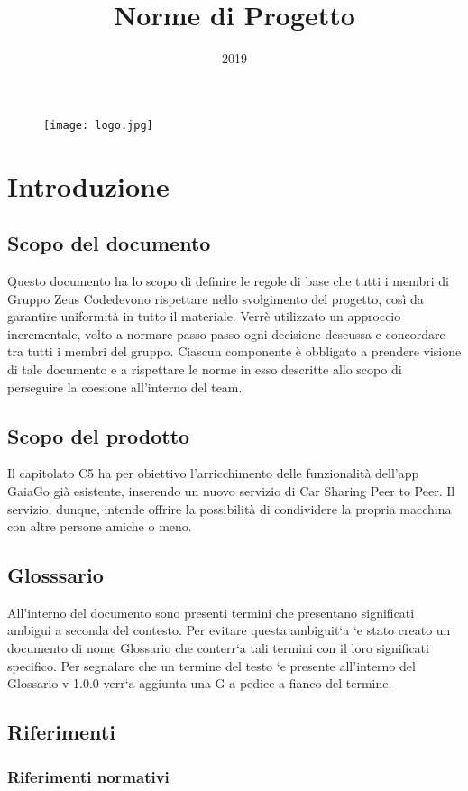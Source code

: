 \documentclass[a4paper]{article}
\title{Norme di Progetto}
\author{\GroupName}
\date{2019}
\newcommand{\GroupName} {Gruppo Zeus Code}
\begin{document}
\begin{figure}
	\centering
	\texttt{[image: logo.jpg]}
\end{figure}

\maketitle
\newpage
\tableofcontents
\newpage
\section{Introduzione}
\subsection{Scopo del documento}
Questo documento  ha lo scopo di definire le regole di base che tutti i membri di \GroupName devono rispettare nello svolgimento del progetto, così da garantire uniformità in tutto il materiale. Verrè utilizzato un approccio incrementale, volto a normare passo passo ogni decisione descussa e concordare tra tutti i membri del gruppo. Ciascun componente è obbligato a prendere visione di tale documento e a rispettare le norme in esso descritte allo scopo di perseguire la coesione all'interno del team.
\subsection{Scopo del prodotto}
Il capitolato C5 ha per obiettivo l'arricchimento delle funzionalità dell'app GaiaGo già esistente, inserendo un nuovo servizio di Car Sharing Peer to Peer.
Il servizio, dunque, intende offrire la possibilità di condividere la propria macchina con altre persone amiche o meno.
\subsection{Glosssario}
All’interno del documento sono presenti termini che presentano significati ambigui a seconda del contesto.  Per evitare questa ambiguit`a `e stato creato un documento di  nome  Glossario  che  conterr`a  tali  termini  con  il  loro  significati  specifico.   Per
segnalare  che  un  termine  del  testo  `e  presente  all’interno  del
Glossario  v  1.0.0 verr`a aggiunta una G a pedice a fianco del termine.
\subsection{Riferimenti}
\subsubsection{Riferimenti normativi}
\end{document}
